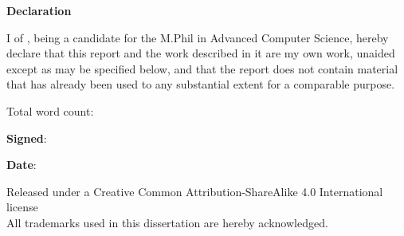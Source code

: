 \newpage
{\Huge \bf Declaration}

\vspace{24pt} 

I \authorname of \authorcollege, being a candidate for the M.Phil in
Advanced Computer Science, hereby declare that this report and the
work described in it are my own work, unaided except as may be
specified below, and that the report does not contain material that
has already been used to any substantial extent for a comparable
purpose.

\vspace{24pt}
Total word count: \diswordcount

\vspace{60pt}
\textbf{Signed}: 

\vspace{12pt}
\textbf{Date}:


\vfill

Released under a Creative Common Attribution-ShareAlike 4.0 International license
\\
All trademarks used in this dissertation are hereby acknowledged.



\newpage
\vspace*{\fill}
